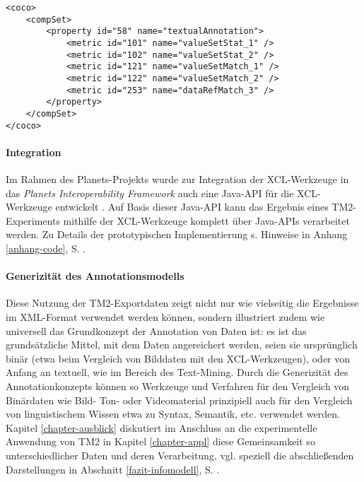 \documentclass[abstracton, 12pt]{scrartcl}
\begin{document}
\begin{lstlisting}[float, label=code-xcl, caption={Beispielkonfiguration für XCL-Vergleich der exportierten Daten}]
<coco>
    <compSet>
        <property id="58" name="textualAnnotation">
            <metric id="101" name="valueSetStat_1" />
            <metric id="102" name="valueSetStat_2" />
            <metric id="121" name="valueSetMatch_1" />
            <metric id="122" name="valueSetMatch_2" />
            <metric id="253" name="dataRefMatch_3" />
        </property>
    </compSet>
</coco>
\end{lstlisting}

\paragraph{Integration}

Im Rahmen des Planets-Projekts wurde zur Integration der XCL-Werkzeuge in das \emph{Planets Interoperability Framework} \citep{RossEtAl2009} auch eine Java-API für die XCL-Werkzeuge entwickelt \citep{SteegEtAl2009}. Auf Basis dieser Java-API kann das Ergebnis eines TM2-Experiments mithilfe der XCL-Werkzeuge komplett über Java-APIs verarbeitet werden. Zu Details der prototypischen Implementierung s. Hinweise in Anhang \ref{anhang-code}, S. \pageref{anhang-code}.

\paragraph{Generizität des Annotationsmodells}

Diese Nutzung der TM2-Exportdaten zeigt nicht nur wie vielseitig die Ergebnisse im XML-Format verwendet werden können, sondern illustriert zudem wie universell das Grundkonzept der Annotation von Daten ist: es ist das grundsätzliche Mittel, mit dem Daten angereichert werden, seien sie ursprünglich binär (etwa beim Vergleich von Bilddaten mit den XCL-Werkzeugen), oder von Anfang an textuell, wie im Bereich des Text-Mining. Durch die Generizität des Annotationkonzepts können so Werkzeuge und Verfahren für den Vergleich von Binärdaten wie Bild- Ton- oder Videomaterial prinzipiell auch für den Vergleich von linguistischem Wissen etwa zu Syntax, Semantik, etc. verwendet werden. Kapitel \ref{chapter-ausblick} diskutiert im Anschluss an die experimentelle Anwendung von TM2 in Kapitel \ref{chapter-appl} diese Gemeinsamkeit so unterschiedlicher Daten und deren Verarbeitung, vgl. speziell die abschließenden Darstellungen in Abschnitt \ref{fazit-infomodell}, S. \pageref{fazit-infomodell}.
\end{document}
